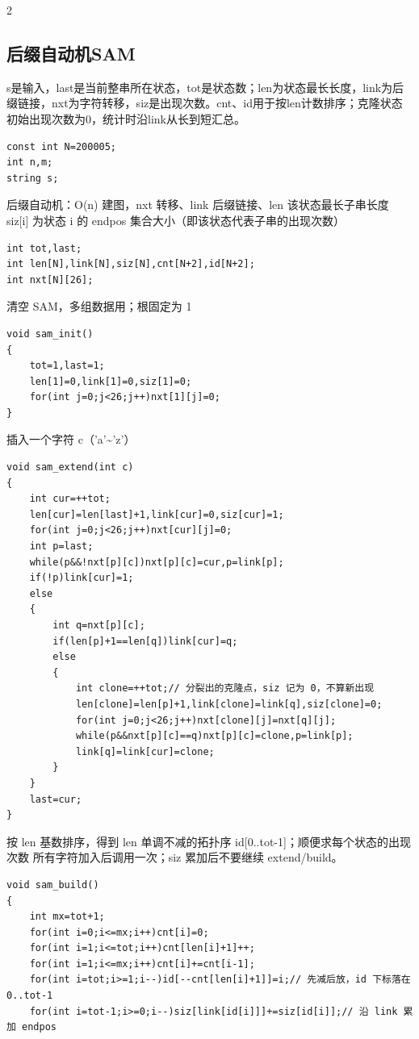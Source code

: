 \documentclass[UTF8,fontset=fandol,a4paper,twoside]{ctexart}
\newcommand{\note}[1]{{\fontsize{10}{12}\selectfont #1\par}}
\begin{document}
\begin{multicols}{2}
\subsection{后缀自动机SAM}

\note{s是输入，last是当前整串所在状态，tot是状态数；len为状态最长长度，link为后缀链接，nxt为字符转移，siz是出现次数。cnt、id用于按len计数排序；克隆状态初始出现次数为0，统计时沿link从长到短汇总。}
\begin{lstlisting}
const int N=200005;
int n,m;
string s;
\end{lstlisting}
\note{后缀自动机：O(\allowbreak{}n)\allowbreak{} 建图，nxt 转移、link 后缀链接、len 该状态最长子串长度 siz[\allowbreak{}i]\allowbreak{} 为状态 i 的 endpos 集合大小（即该状态代表子串的出现次数）}
\begin{lstlisting}
int tot,last;
int len[N],link[N],siz[N],cnt[N+2],id[N+2];
int nxt[N][26];
\end{lstlisting}
\note{清空 SAM，多组数据用；根固定为 1}
\begin{lstlisting}
void sam_init()
{
    tot=1,last=1;
    len[1]=0,link[1]=0,siz[1]=0;
    for(int j=0;j<26;j++)nxt[1][j]=0;
}
\end{lstlisting}
\note{插入一个字符 c（'a'\textasciitilde{}'z'）}
\begin{lstlisting}
void sam_extend(int c)
{
    int cur=++tot;
    len[cur]=len[last]+1,link[cur]=0,siz[cur]=1;
    for(int j=0;j<26;j++)nxt[cur][j]=0;
    int p=last;
    while(p&&!nxt[p][c])nxt[p][c]=cur,p=link[p];
    if(!p)link[cur]=1;
    else
    {
        int q=nxt[p][c];
        if(len[p]+1==len[q])link[cur]=q;
        else
        {
            int clone=++tot;// 分裂出的克隆点，siz 记为 0，不算新出现
            len[clone]=len[p]+1,link[clone]=link[q],siz[clone]=0;
            for(int j=0;j<26;j++)nxt[clone][j]=nxt[q][j];
            while(p&&nxt[p][c]==q)nxt[p][c]=clone,p=link[p];
            link[q]=link[cur]=clone;
        }
    }
    last=cur;
}
\end{lstlisting}
\note{按 len 基数排序，得到 len 单调不减的拓扑序 id[\allowbreak{}0.\allowbreak{}.\allowbreak{}tot-\allowbreak{}1]\allowbreak{}；顺便求每个状态的出现次数 所有字符加入后调用一次；siz 累加后不要继续 extend/\allowbreak{}build。}
\begin{lstlisting}
void sam_build()
{
    int mx=tot+1;
    for(int i=0;i<=mx;i++)cnt[i]=0;
    for(int i=1;i<=tot;i++)cnt[len[i]+1]++;
    for(int i=1;i<=mx;i++)cnt[i]+=cnt[i-1];
    for(int i=tot;i>=1;i--)id[--cnt[len[i]+1]]=i;// 先减后放，id 下标落在 0..tot-1
    for(int i=tot-1;i>=0;i--)siz[link[id[i]]]+=siz[id[i]];// 沿 link 累加 endpos

\end{lstlisting}
\end{multicols}
\end{document}
